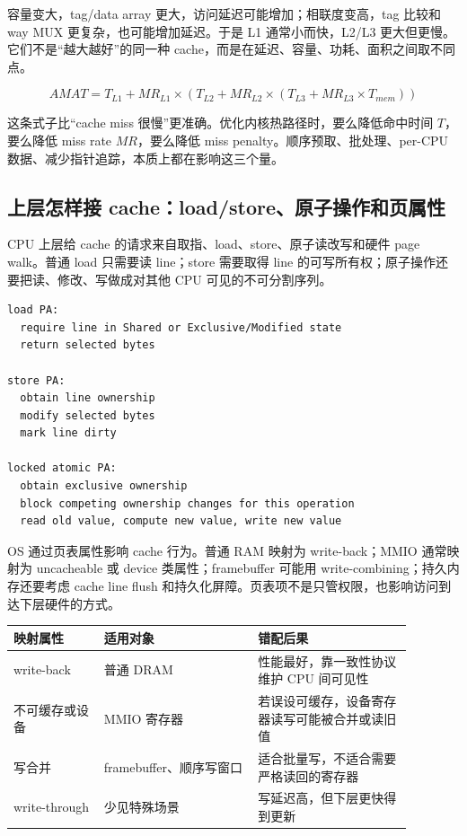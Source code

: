 容量变大，tag/data array 更大，访问延迟可能增加；相联度变高，tag 比较和 way MUX 更复杂，也可能增加延迟。于是 L1 通常小而快，L2/L3 更大但更慢。它们不是“越大越好”的同一种 cache，而是在延迟、容量、功耗、面积之间取不同点。

\[
AMAT = T_{L1} + MR_{L1}\times(T_{L2}+MR_{L2}\times(T_{L3}+MR_{L3}\times T_{mem}))
\]

这条式子比“cache miss 很慢”更准确。优化内核热路径时，要么降低命中时间 \(T\)，要么降低 miss rate \(MR\)，要么降低 miss penalty。顺序预取、批处理、per-CPU 数据、减少指针追踪，本质上都在影响这三个量。

\subsection{上层怎样接 cache：load/store、原子操作和页属性}

CPU 上层给 cache 的请求来自取指、load、store、原子读改写和硬件 page walk。普通 load 只需要读 line；store 需要取得 line 的可写所有权；原子操作还要把读、修改、写做成对其他 CPU 可见的不可分割序列。

\begin{lstlisting}
load PA:
  require line in Shared or Exclusive/Modified state
  return selected bytes

store PA:
  obtain line ownership
  modify selected bytes
  mark line dirty

locked atomic PA:
  obtain exclusive ownership
  block competing ownership changes for this operation
  read old value, compute new value, write new value
\end{lstlisting}

OS 通过页表属性影响 cache 行为。普通 RAM 映射为 write-back；MMIO 通常映射为 uncacheable 或 device 类属性；framebuffer 可能用 write-combining；持久内存还要考虑 cache line flush 和持久化屏障。页表项不是只管权限，也影响访问到达下层硬件的方式。

\begin{longtable}{p{0.20\linewidth}p{0.34\linewidth}p{0.34\linewidth}}
\toprule
映射属性 & 适用对象 & 错配后果 \\
\midrule
write-back & 普通 DRAM & 性能最好，靠一致性协议维护 CPU 间可见性 \\
不可缓存或设备 & MMIO 寄存器 & 若误设可缓存，设备寄存器读写可能被合并或读旧值 \\
写合并 & framebuffer、顺序写窗口 & 适合批量写，不适合需要严格读回的寄存器 \\
write-through & 少见特殊场景 & 写延迟高，但下层更快得到更新 \\
\bottomrule
\end{longtable}

